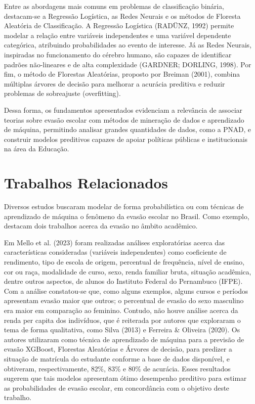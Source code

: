 \documentclass[english, spanish, brazilian]{RBIEarticle} %
\begin{document}
Entre as abordagens mais comuns em problemas de classificação binária, destacam-se a Regressão Logística, as Redes Neurais e os métodos de Floresta Aleatória de Classificação. A Regressão Logística (RADÜNZ, 1992) permite modelar a relação entre variáveis independentes e uma variável dependente categórica, atribuindo probabilidades ao evento de interesse. Já as Redes Neurais, inspiradas no funcionamento do cérebro humano, são capazes de identificar padrões não-lineares e de alta complexidade (GARDNER; DORLING, 1998). Por fim, o método de Florestas Aleatórias, proposto por Breiman (2001), combina múltiplas árvores de decisão para melhorar a acurácia preditiva e reduzir problemas de sobreajuste (overfitting).

Dessa forma, os fundamentos apresentados evidenciam a relevância de associar teorias sobre evasão escolar com métodos de mineração de dados e aprendizado de máquina, permitindo analisar grandes quantidades de dados, como a PNAD, e construir modelos preditivos capazes de apoiar políticas públicas e institucionais na área da Educação.

\section{Trabalhos Relacionados}
Diversos estudos buscaram modelar de forma probabilística ou com técnicas de aprendizado de máquina o fenômeno da evasão escolar no Brasil. Como exemplo, destacam dois trabalhos acerca da evasão no âmbito acadêmico.

Em Mello et al. (2023) foram realizadas análises exploratórias acerca das características consideradas (variáveis independentes) como coeficiente de rendimento, tipo de escola de origem, percentual de frequência, nível de ensino, cor ou raça, modalidade de curso, sexo, renda familiar bruta, situação acadêmica, dentre outros aspectos, de alunos do Instituto Federal do Pernambuco (IFPE). Com a análise constatou-se que, como alguns exemplos, alguns cursos e períodos apresentam evasão maior que outros; o percentual de evasão do sexo masculino era maior em comparação ao feminino. Contudo, não houve análise acerca da renda per capita dos indivíduos, que é reiterada por autores que exploraram o tema de forma qualitativa, como Silva (2013) e Ferreira \& Oliveira (2020). Os autores utilizaram como técnica de aprendizado de máquina para a previsão de evasão XGBoost, Florestas Aleatórias e Árvores de decisão, para predizer a situação de matrícula do estudante conforme a base de dados disponível, e obtiveram, respectivamente, 82\%, 83\% e 80\% de acurácia. Esses resultados sugerem que tais modelos apresentam ótimo desempenho preditivo para estimar as probabilidades de evasão escolar, em concordância com o objetivo deste trabalho.
\end{document}
